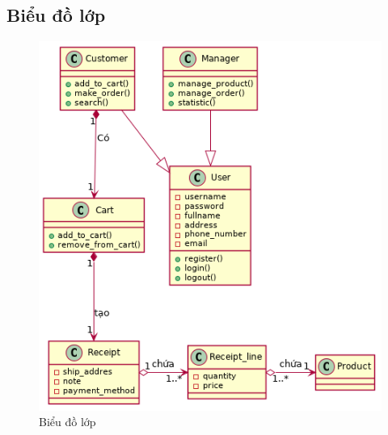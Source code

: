 \subsection{Biểu đồ lớp}
\begin{figure}[h!]
    \centering
    \includegraphics[scale=0.7]{fig/class.png}
    \caption{Biểu đồ lớp}
\end{figure}
\newpage
